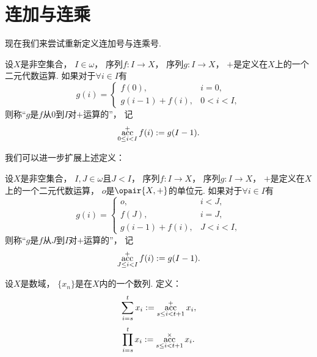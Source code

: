 \section{连加与连乘}
现在我们来尝试重新定义连加号与连乘号.

\begin{definition}
设\(X\)是非空集合，
\(I\in\omega\)，
序列\(f\colon I \to X\)，
序列\(g\colon I \to X\)，
\(+\)是定义在\(X\)上的一个二元代数运算.
如果对于\(\forall i\in I\)有\begin{equation*}
	g(i) = \left\{ \begin{array}{lc}
		f(0), & i=0, \\
		g(i-1) + f(i), & 0<i<I,
	\end{array} \right.
\end{equation*}
则称“\(g\)是\(f\)从\(0\)到\(I\)对\(+\)运算的”，
记\begin{equation*}
	\operatorname*{acc}_{0 \leq i < I}^+ f(i)
	:=
	g(I-1).
\end{equation*}
\end{definition}

我们可以进一步扩展上述定义：
\begin{definition}
设\(X\)是非空集合，
\(I,J\in\omega\)且\(J<I\)，
序列\(f\colon I \to X\)，
序列\(g\colon I \to X\)，
\(+\)是定义在\(X\)上的一个二元代数运算，
\(o\)是\(\opair{X,+}\)的单位元.
如果对于\(\forall i\in I\)有\begin{equation*}
	g(i) = \left\{ \begin{array}{lc}
		o, & i<J, \\
		f(J), & i=J, \\
		g(i-1) + f(i), & J<i<I,
	\end{array} \right.
\end{equation*}
则称“\(g\)是\(f\)从\(J\)到\(I\)对\(+\)运算的”，
记\begin{equation*}
	\operatorname*{acc}_{J \leq i < I}^+ f(i)
	:=
	g(I-1).
\end{equation*}
\end{definition}

\begin{definition}
设\(X\)是数域，
\(\{x_n\}\)是在\(X\)内的一个数列.
定义：\begin{equation*}
	\sum_{i=s}^t x_i
	:=
	\operatorname*{acc}_{s \leq i < t+1}^+ x_i,
\end{equation*}\begin{equation*}
	\prod_{i=s}^t x_i
	:=
	\operatorname*{acc}_{s \leq i < t+1}^\times x_i.
\end{equation*}
\end{definition}
